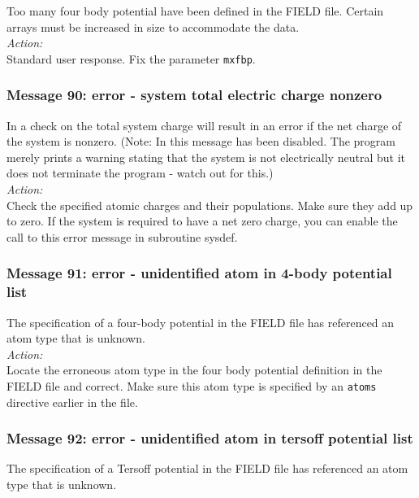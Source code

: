 Too many four body potential  have been defined in the FIELD file.
Certain arrays must be increased in size to accommodate the data.\\

\noindent
{\em Action:}\\
Standard user response. Fix the parameter {\tt mxfbp}.

\subsubsection*{Message 90: error - system total electric charge nonzero}

In \D{} a check on the total system charge will
result in an error if the net charge of the system is nonzero.  (Note:
In \D{}  this message has been disabled. The program
merely prints a warning stating that the system is not electrically neutral 
but it does not terminate the program - watch out for this.) \\  

\noindent
{\em Action:} \\ 
Check the specified atomic charges and their populations. Make sure
they add up to zero. If the system is required to have a net zero charge,
you can enable the call to this error message in subroutine {\sc sysdef}.

\subsubsection*{Message 91: error - unidentified atom in 4-body
potential list}

The specification of a four-body  potential in the FIELD file has
referenced an atom type that is unknown.\\

\noindent
{\em Action:}\\
Locate the erroneous atom type in the four body potential definition in
the FIELD file and correct. Make sure this atom type is specified by
an {\tt atoms} directive earlier in the file.

\subsubsection*{Message 92: error - unidentified atom in tersoff potential list}

The specification of a Tersoff  potential in the FIELD file has
referenced an atom type that is unknown.\\

